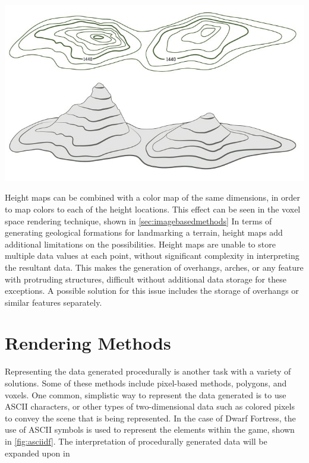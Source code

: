 \documentclass[10pt]{report}
\begin{document}
			\begin{minipage}{\textwidth}
				\centering
				\includegraphics[scale=.4]{top-map}
				\label{fig:top-map}
			\end{minipage} 
		
			Height maps can be combined with a color map of the same dimensions, in order to map colors to each of the height locations. This effect can be seen in the voxel space rendering technique, shown in \ref{sec:imagebasedmethods} In terms of generating geological formations for landmarking a terrain, height maps add additional limitations on the possibilities. Height maps are unable to store multiple data values at each point, without significant complexity in interpreting the resultant data. This makes the generation of overhangs, arches, or any feature with protruding structures, difficult without additional data storage for these exceptions. A possible solution for this issue includes the storage of overhangs or similar features separately.
		
	\vspace{10pt}
	\let\clearpage\relax
	\chapter{Rendering Methods}
	
		Representing the data generated procedurally is another task with a variety of solutions. Some of these methods include pixel-based methods, polygons, and voxels. One common, simplistic way to represent the data generated is to use ASCII characters, or other types of two-dimensional data such as colored pixels to convey the scene that is being represented. In the case of Dwarf Fortress, the use of ASCII symbols is used to represent the elements within the game, shown in \autoref{fig:asciidf}. The interpretation of procedurally generated data will be expanded upon in 
		
\end{document}
